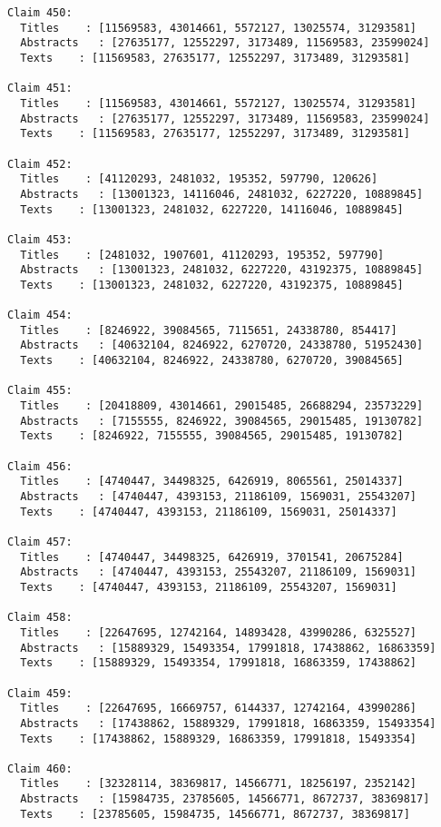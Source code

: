 \documentclass[11pt]{article}
\begin{document}
\begin{Verbatim}[commandchars=\\\{\}]
Claim 450:
  Titles    : [11569583, 43014661, 5572127, 13025574, 31293581]
  Abstracts   : [27635177, 12552297, 3173489, 11569583, 23599024]
  Texts    : [11569583, 27635177, 12552297, 3173489, 31293581]

Claim 451:
  Titles    : [11569583, 43014661, 5572127, 13025574, 31293581]
  Abstracts   : [27635177, 12552297, 3173489, 11569583, 23599024]
  Texts    : [11569583, 27635177, 12552297, 3173489, 31293581]

Claim 452:
  Titles    : [41120293, 2481032, 195352, 597790, 120626]
  Abstracts   : [13001323, 14116046, 2481032, 6227220, 10889845]
  Texts    : [13001323, 2481032, 6227220, 14116046, 10889845]

Claim 453:
  Titles    : [2481032, 1907601, 41120293, 195352, 597790]
  Abstracts   : [13001323, 2481032, 6227220, 43192375, 10889845]
  Texts    : [13001323, 2481032, 6227220, 43192375, 10889845]

Claim 454:
  Titles    : [8246922, 39084565, 7115651, 24338780, 854417]
  Abstracts   : [40632104, 8246922, 6270720, 24338780, 51952430]
  Texts    : [40632104, 8246922, 24338780, 6270720, 39084565]

Claim 455:
  Titles    : [20418809, 43014661, 29015485, 26688294, 23573229]
  Abstracts   : [7155555, 8246922, 39084565, 29015485, 19130782]
  Texts    : [8246922, 7155555, 39084565, 29015485, 19130782]

Claim 456:
  Titles    : [4740447, 34498325, 6426919, 8065561, 25014337]
  Abstracts   : [4740447, 4393153, 21186109, 1569031, 25543207]
  Texts    : [4740447, 4393153, 21186109, 1569031, 25014337]

Claim 457:
  Titles    : [4740447, 34498325, 6426919, 3701541, 20675284]
  Abstracts   : [4740447, 4393153, 25543207, 21186109, 1569031]
  Texts    : [4740447, 4393153, 21186109, 25543207, 1569031]

Claim 458:
  Titles    : [22647695, 12742164, 14893428, 43990286, 6325527]
  Abstracts   : [15889329, 15493354, 17991818, 17438862, 16863359]
  Texts    : [15889329, 15493354, 17991818, 16863359, 17438862]

Claim 459:
  Titles    : [22647695, 16669757, 6144337, 12742164, 43990286]
  Abstracts   : [17438862, 15889329, 17991818, 16863359, 15493354]
  Texts    : [17438862, 15889329, 16863359, 17991818, 15493354]

Claim 460:
  Titles    : [32328114, 38369817, 14566771, 18256197, 2352142]
  Abstracts   : [15984735, 23785605, 14566771, 8672737, 38369817]
  Texts    : [23785605, 15984735, 14566771, 8672737, 38369817]


\end{Verbatim}
\end{document}

